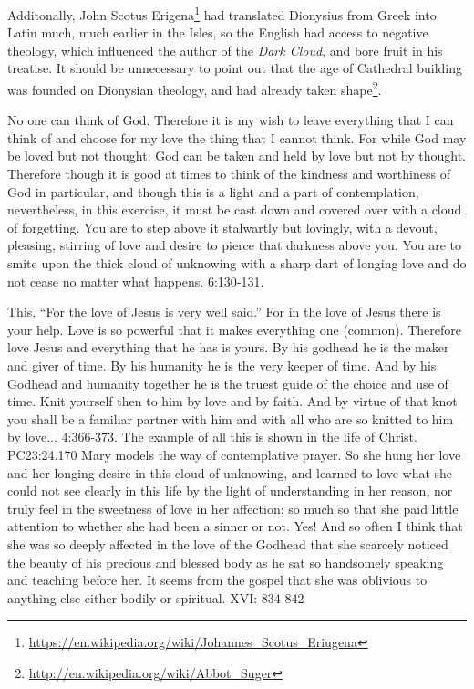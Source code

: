 Additonally, John Scotus Erigena\footnote{\url{https://en.wikipedia.org/wiki/Johannes\_Scotus\_Eriugena}} had translated Dionysius from Greek into Latin much, much earlier in the Isles, so the English had access to negative theology, which influenced the author of the \emph{Dark Cloud}, and bore fruit in his treatise. It should be unnecessary to point out that the age of Cathedral building was founded on Dionysian theology, and had already taken shape\footnote{\url{http://en.wikipedia.org/wiki/Abbot\_Suger}}.

\begin{quotationx}
No one can think of God. Therefore it is my wish to leave everything that I can think of and choose for my love the thing that I cannot think. For while God may be loved but not thought. God can be taken and held by love but not by thought. Therefore though it is good at times to think of the kindness and worthiness of God in particular, and though this is a light and a part of contemplation, nevertheless, in this exercise, it must be cast down and covered over with a cloud of forgetting. You are to step above it stalwartly but lovingly, with a devout, pleasing, stirring of love and desire to pierce that darkness above you. You are to smite upon the thick cloud of unknowing with a sharp dart of longing love and do not cease no matter what happens. 6:130-131.

This, ``For the love of Jesus is very well said.'' For in the love of Jesus there is your help. Love is so powerful that it makes everything one (common). Therefore love Jesus and everything that he has is yours. By his godhead he is the maker and giver of time. By his humanity he is the very keeper of time. And by his Godhead and humanity together he is the truest guide of the choice and use of time. Knit yourself then to him by love and by faith. And by virtue of that knot you shall be a familiar partner with him and with all who are so knitted to him by love... 4:366-373. The example of all this is shown in the life of Christ. PC23:24.170 Mary models the way of contemplative prayer. So she hung her love and her longing desire in this cloud of unknowing, and learned to love what she could not see clearly in this life by the light of understanding in her reason, nor truly feel in the sweetness of love in her affection; so much so that she paid little attention to whether she had been a sinner or not. Yes! And so often I think that she was so deeply affected in the love of the Godhead that she scarcely noticed the beauty of his precious and blessed body as he sat so handsomely speaking and teaching before her. It seems from the gospel that she was oblivious to anything else either bodily or spiritual. XVI: 834-842
\end{quotationx}


